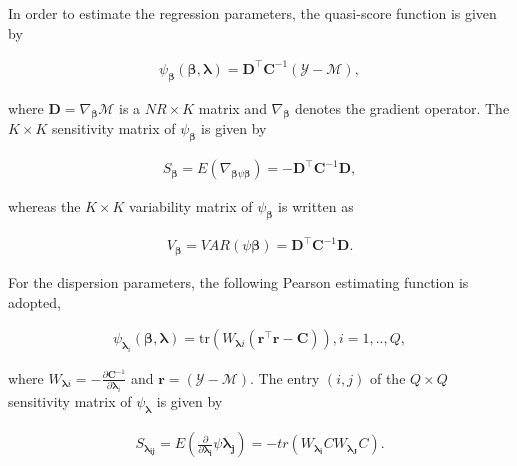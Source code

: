 \documentclass[article]{jss}\usepackage[]{graphicx}\usepackage[]{xcolor}
\begin{document}
In order to estimate the regression parameters, the quasi-score function \citep{Liang86} is given by 

$$
\begin{aligned}
  \psi_{\boldsymbol{\beta}}(\boldsymbol{\beta},
  \boldsymbol{\lambda}) = \boldsymbol{D}^\top
  \boldsymbol{C}^{-1}(\mathcal{Y} - \mathcal{M}),
\end{aligned}
$$

\noindent where $\boldsymbol{D} = \nabla_{\boldsymbol{\beta}} \mathcal{M}$ is a $NR \times K$ matrix and $\nabla_{\boldsymbol{\beta}}$ denotes the gradient operator. The $K \times K$ sensitivity matrix of $\psi_{\boldsymbol{\beta}}$ is given by

$$
\begin{aligned}
S_{\boldsymbol{\beta}} = E(\nabla_{\boldsymbol{\beta} \psi \boldsymbol{\beta}}) = -\boldsymbol{D}^{\top} \boldsymbol{C}^{-1} \boldsymbol{D},
\end{aligned}
$$

\noindent whereas the $K \times K$ variability matrix of $\psi_{\boldsymbol{\beta}}$ is written as

$$
\begin{aligned}
V_{\boldsymbol{\beta}} = VAR(\psi \boldsymbol{\beta}) = \boldsymbol{D}^{\top} \boldsymbol{C}^{-1} \boldsymbol{D}.
\end{aligned}
$$

For the dispersion parameters, the following Pearson estimating function is adopted,

$$
  \begin{aligned}
    \psi_{\boldsymbol{\lambda}_i}(\boldsymbol{\beta},
    \boldsymbol{\lambda}) =
    \mathrm{tr}(W_{\boldsymbol{\lambda}i}
    (\boldsymbol{r}^\top\boldsymbol{r} -
    \boldsymbol{C})),  i = 1,.., Q, 
  \end{aligned}
$$

\noindent where $W_{\boldsymbol{\lambda}i} = -\frac{\partial \boldsymbol{C}^{-1}}{\partial \boldsymbol{\lambda}_i}$ and $\boldsymbol{r} = (\mathcal{Y} - \mathcal{M})$. The entry $(i,j)$ of the $Q \times Q$ sensitivity matrix of $\psi_{\boldsymbol{\lambda}}$ is given by

$$
  \begin{aligned}
    S_{\boldsymbol{\lambda_{ij}}} = E \left (\frac{\partial }{\partial \boldsymbol{\lambda_{i}}} \psi \boldsymbol{\lambda_{j}}\right) = -tr(W_{\boldsymbol{\lambda_{i}}} CW_{\boldsymbol{\lambda_{J}}} C).
  \end{aligned}
$$
\end{document}
